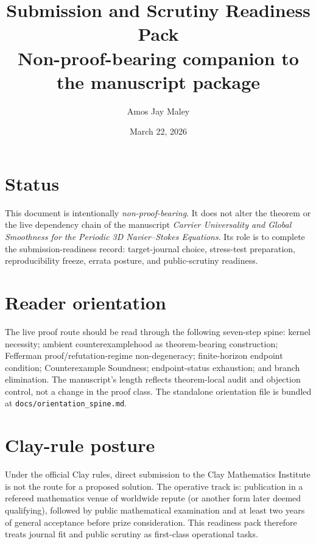 \documentclass[11pt]{article}
\title{\textbf{Submission and Scrutiny Readiness Pack}\\[0.3em]\large Non-proof-bearing companion to the manuscript package}
\author{Amos Jay Maley}
\date{March 22, 2026}
\begin{document}
\maketitle

\section*{Status}
This document is intentionally \emph{non-proof-bearing}. It does not alter the theorem or the live dependency chain of the manuscript \emph{Carrier Universality and Global Smoothness for the Periodic 3D Navier--Stokes Equations}. Its role is to complete the submission-readiness record: target-journal choice, stress-test preparation, reproducibility freeze, errata posture, and public-scrutiny readiness.


\section{Reader orientation}
The live proof route should be read through the following seven-step spine: kernel necessity; ambient counterexamplehood as theorem-bearing construction; Fefferman proof/refutation-regime non-degeneracy; finite-horizon endpoint condition; Counterexample Soundness; endpoint-status exhaustion; and branch elimination. The manuscript's length reflects theorem-local audit and objection control, not a change in the proof class. The standalone orientation file is bundled at \texttt{docs/orientation\_spine.md}.

\section{Clay-rule posture}
Under the official Clay rules, direct submission to the Clay Mathematics Institute is not the route for a proposed solution. The operative track is: publication in a refereed mathematics venue of worldwide repute (or another form later deemed qualifying), followed by public mathematical examination and at least two years of general acceptance before prize consideration. This readiness pack therefore treats journal fit and public scrutiny as first-class operational tasks.
\end{document}
